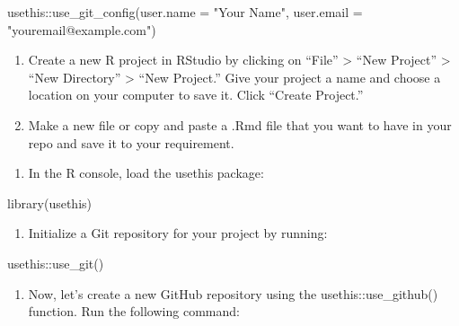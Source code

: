 \documentclass[
]{book}
\newenvironment{Shaded}{\begin{snugshade}}{\end{snugshade}}
\newcommand{\AttributeTok}[1]{\textcolor[rgb]{0.77,0.63,0.00}{#1}}
\newcommand{\FunctionTok}[1]{\textcolor[rgb]{0.00,0.00,0.00}{#1}}
\newcommand{\NormalTok}[1]{#1}
\newcommand{\SpecialCharTok}[1]{\textcolor[rgb]{0.00,0.00,0.00}{#1}}
\newcommand{\StringTok}[1]{\textcolor[rgb]{0.31,0.60,0.02}{#1}}
\providecommand{\tightlist}{%
  \setlength{\itemsep}{0pt}\setlength{\parskip}{0pt}}
\begin{document}
\begin{Shaded}
\begin{Highlighting}[]
\NormalTok{usethis}\SpecialCharTok{::}\FunctionTok{use\_git\_config}\NormalTok{(}\AttributeTok{user.name =} \StringTok{"Your Name"}\NormalTok{, }\AttributeTok{user.email =} \StringTok{"youremail@example.com"}\NormalTok{)}
\end{Highlighting}
\end{Shaded}

\begin{enumerate}
\def\labelenumi{\arabic{enumi}.}
\setcounter{enumi}{3}
\item
  Create a new R project in RStudio by clicking on ``File'' \textgreater{} ``New Project'' \textgreater{} ``New Directory'' \textgreater{} ``New Project.'' Give your project a name and choose a location on your computer to save it. Click ``Create Project.''
\item
  Make a new file or copy and paste a .Rmd file that you want to have in your repo and save it to your requirement.
\end{enumerate}

\begin{enumerate}
\def\labelenumi{\arabic{enumi}.}
\setcounter{enumi}{5}
\tightlist
\item
  In the R console, load the usethis package:
\end{enumerate}

\begin{Shaded}
\begin{Highlighting}[]
\FunctionTok{library}\NormalTok{(usethis)}
\end{Highlighting}
\end{Shaded}

\begin{enumerate}
\def\labelenumi{\arabic{enumi}.}
\setcounter{enumi}{6}
\tightlist
\item
  Initialize a Git repository for your project by running:
\end{enumerate}

\begin{Shaded}
\begin{Highlighting}[]
\NormalTok{usethis}\SpecialCharTok{::}\FunctionTok{use\_git}\NormalTok{()}
\end{Highlighting}
\end{Shaded}

\begin{enumerate}
\def\labelenumi{\arabic{enumi}.}
\setcounter{enumi}{7}
\tightlist
\item
  Now, let's create a new GitHub repository using the usethis::use\_github() function. Run the following command:
\end{enumerate}
\end{document}
